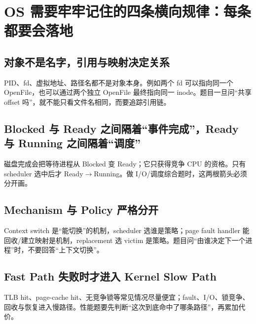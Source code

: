\documentclass[11pt,a4paper,openany]{ctexbook}
\begin{document}
\section{OS 需要牢牢记住的四条横向规律：每条都要会落地}
\subsection{对象不是名字，引用与映射决定关系}
PID、fd、虚拟地址、路径名都不是对象本身。例如两个 fd 可以指向同一个 OpenFile，也可以通过两个独立 OpenFile 最终指向同一 inode。题目一旦问“共享 offset 吗”，就不能只看文件名相同，而要追踪引用链。

\subsection{Blocked 与 Ready 之间隔着“事件完成”，Ready 与 Running 之间隔着“调度”}
磁盘完成会把等待进程从 Blocked 变 Ready；它只获得竞争 CPU 的资格。只有 scheduler 选中后才 Ready$\to$Running。做 I/O/调度综合题时，这两根箭头必须分开画。

\subsection{Mechanism 与 Policy 严格分开}
Context switch 是“能切换”的机制，scheduler 选谁是策略；page fault handler 能回收/建立映射是机制，replacement 选 victim 是策略。题目问“由谁决定下一个进程”时，不要回答“上下文切换”。

\subsection{Fast Path 失败时才进入 Kernel Slow Path}
TLB hit、page-cache hit、无竞争锁等常见情况尽量便宜；fault、I/O、锁竞争、回收与恢复进入慢路径。性能题要先判断“这次到底命中了哪条路径”，再累加代价。
\end{document}

